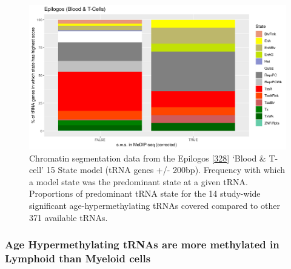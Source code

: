 \documentclass[
]{book}
\begin{document}
\begin{figure}

{\centering \includegraphics[width=0.9\linewidth]{./figs/maxScoreBytRNAtRNAge6SplitPlot_BL} 

}

\caption{Chromatin segmentation data from the Epilogos {[}\protect\hyperlink{ref-Meuleman2019}{328}{]} `Blood \& T-cell' 15 State model (tRNA genes +/- 200bp). Frequency with which a model state was the predominant state at a given tRNA. Proportions of predominant tRNA state for the 14 study-wide significant age-hypermethylating tRNAs covered compared to other 371 available tRNAs.}\label{fig:combinedEpilogosPlot}
\end{figure}



\hypertarget{age-hypermethylating-trnas-are-more-methylated-in-lymphoid-than-myeloid-cells}{%
\subsubsection{Age Hypermethylating tRNAs are more methylated in Lymphoid than Myeloid cells}\label{age-hypermethylating-trnas-are-more-methylated-in-lymphoid-than-myeloid-cells}}
\end{document}
